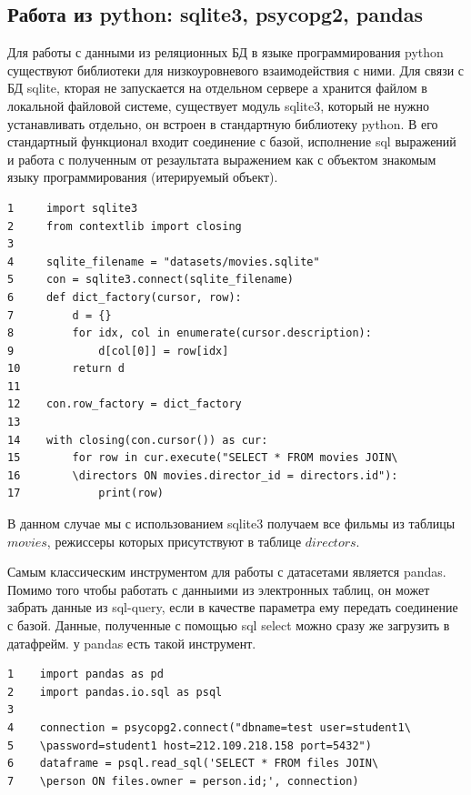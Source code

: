 \documentclass[12pt, a4paper]{article}
\begin{document}
{\subsection{Работа из python: sqlite3, 
psycopg2, pandas}

Для работы с данными из реляционных БД в языке 
программирования python существуют библиотеки 
для низкоуровневого взаимодействия с ними.
Для связи с БД sqlite, кторая не запускается на 
отдельном сервере а хранится файлом в 
локальной файловой системе, существует модуль 
sqlite3, который не нужно устанавливать отдельно, 
он встроен в стандартную библиотеку python.
В его стандартный функционал входит соединение с базой, 
исполнение sql выражений и работа с полученным от 
резаультата выражением как с объектом знакомым 
языку программирования (итерируемый объект).
\begin{verbatim}
1     import sqlite3
2     from contextlib import closing
3 
4     sqlite_filename = "datasets/movies.sqlite"
5     con = sqlite3.connect(sqlite_filename)
6     def dict_factory(cursor, row):
7         d = {}
8         for idx, col in enumerate(cursor.description):
9             d[col[0]] = row[idx]
10        return d
11    
12    con.row_factory = dict_factory
13
14    with closing(con.cursor()) as cur:
15        for row in cur.execute("SELECT * FROM movies JOIN\ 
16        \directors ON movies.director_id = directors.id"):
17            print(row)
\end{verbatim}
В данном случае мы с использованием sqlite3 получаем все
фильмы из таблицы \(movies\), режиссеры которых присутствуют 
в таблице \(directors\).  

\vspace{1em}

Самым классическим инструментом для работы с датасетами 
является pandas. Помимо того чтобы работать с данныими из 
электронных таблиц, он может забрать данные из sql-query, 
если в качестве параметра ему передать соединение с базой.
Данные, полученные с помощью sql select можно сразу же 
загрузить в датафрейм. у pandas есть такой инструмент.

\begin{verbatim}
1    import pandas as pd
2    import pandas.io.sql as psql
3
4    connection = psycopg2.connect("dbname=test user=student1\
5    \password=student1 host=212.109.218.158 port=5432")
6    dataframe = psql.read_sql('SELECT * FROM files JOIN\
7    \person ON files.owner = person.id;', connection)
\end{verbatim}

}
\end{document}
